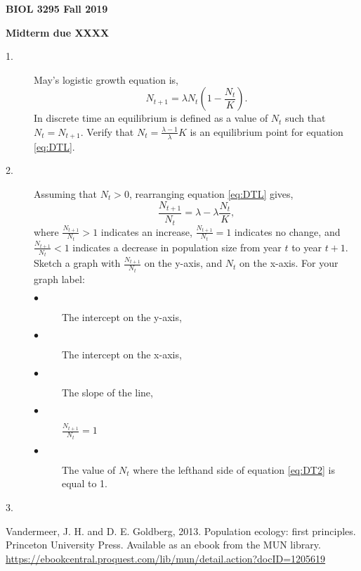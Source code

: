 \documentclass[10pt, oneside]{article}   	%
\begin{document}
\textbf{BIOL 3295 Fall 2019}

\textbf{Midterm due XXXX}

\begin{description}
\item[1.] May's logistic growth equation is,
%
\begin{equation}\label{eq:DTL}
N_{t+1} = \lambda N_t \left(1-\frac{N_t}{K}\right).
\end{equation}
%
In discrete time an equilibrium is defined as a value of $N_t$ such that $N_t = N_{t+1}$. Verify that $N_t=\frac{\lambda-1}{\lambda}K$ is an equilibrium point for equation \ref{eq:DTL}.

\item[2.] Assuming that $N_t > 0$, rearranging equation \ref{eq:DTL} gives,
%
\begin{equation}\label{eq:DT2}
\frac{N_{t+1}}{N_t} = \lambda - \lambda \frac{N_t}{K},
\end{equation}
%
where $\frac{N_{t+1}}{N_t} > 1$ indicates an increase, $\frac{N_{t+1}}{N_t} = 1$ indicates no change, and $\frac{N_{t+1}}{N_t} < 1$  indicates a decrease in population size from year $t$ to year $t+1$. Sketch a graph with $\frac{N_{t+1}}{N_t}$ on the y-axis, and $N_t$ on the x-axis. For your graph label:
\begin{description}
\item[$\bullet$] The intercept on the y-axis,
\item[$\bullet$] The intercept on the x-axis,
\item[$\bullet$] The slope of the line,
\item[$\bullet$] $\frac{N_{t+1}}{N_t} = 1$
\item[$\bullet$] The value of $N_t$ where the lefthand side of equation \ref{eq:DT2} is equal to 1.
\end{description}
\item[3.]

\end{description}


\begin{thebibliography}{10}
 Vandermeer, J. H. and D. E. Goldberg, 2013. Population ecology: first principles. Princeton University Press. Available as an ebook from the MUN library. \url{https://ebookcentral.proquest.com/lib/mun/detail.action?docID=1205619}
\end{thebibliography}
\end{document}
